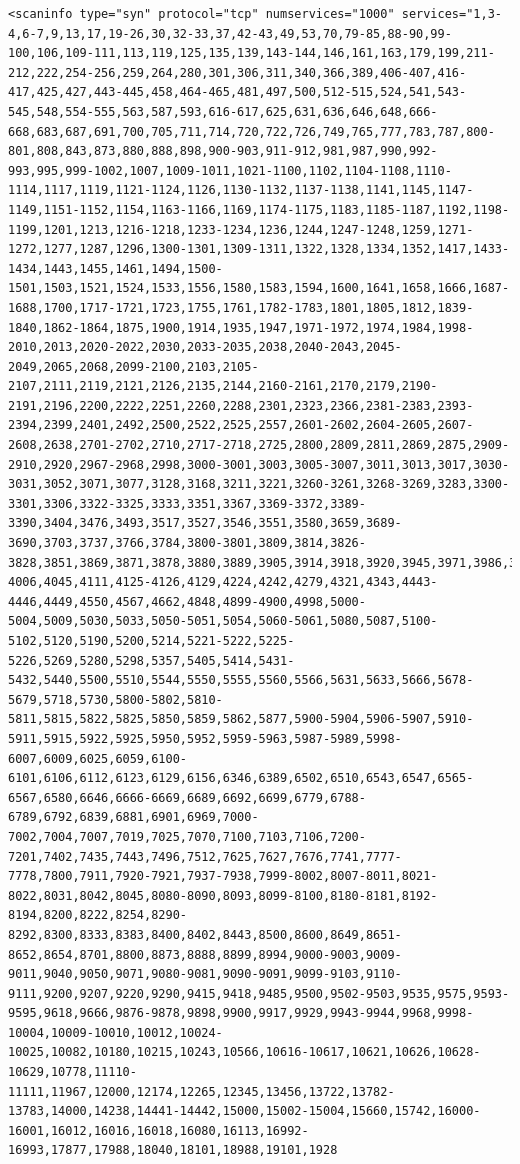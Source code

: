 \documentclass[10pt,a4paper]{report}
\begin{document}
\begin{verbatim}
<scaninfo type="syn" protocol="tcp" numservices="1000" services="1,3-4,6-7,9,13,17,19-26,30,32-33,37,42-43,49,53,70,79-85,88-90,99-100,106,109-111,113,119,125,135,139,143-144,146,161,163,179,199,211-212,222,254-256,259,264,280,301,306,311,340,366,389,406-407,416-417,425,427,443-445,458,464-465,481,497,500,512-515,524,541,543-545,548,554-555,563,587,593,616-617,625,631,636,646,648,666-668,683,687,691,700,705,711,714,720,722,726,749,765,777,783,787,800-801,808,843,873,880,888,898,900-903,911-912,981,987,990,992-993,995,999-1002,1007,1009-1011,1021-1100,1102,1104-1108,1110-1114,1117,1119,1121-1124,1126,1130-1132,1137-1138,1141,1145,1147-1149,1151-1152,1154,1163-1166,1169,1174-1175,1183,1185-1187,1192,1198-1199,1201,1213,1216-1218,1233-1234,1236,1244,1247-1248,1259,1271-1272,1277,1287,1296,1300-1301,1309-1311,1322,1328,1334,1352,1417,1433-1434,1443,1455,1461,1494,1500-1501,1503,1521,1524,1533,1556,1580,1583,1594,1600,1641,1658,1666,1687-1688,1700,1717-1721,1723,1755,1761,1782-1783,1801,1805,1812,1839-1840,1862-1864,1875,1900,1914,1935,1947,1971-1972,1974,1984,1998-2010,2013,2020-2022,2030,2033-2035,2038,2040-2043,2045-2049,2065,2068,2099-2100,2103,2105-2107,2111,2119,2121,2126,2135,2144,2160-2161,2170,2179,2190-2191,2196,2200,2222,2251,2260,2288,2301,2323,2366,2381-2383,2393-2394,2399,2401,2492,2500,2522,2525,2557,2601-2602,2604-2605,2607-2608,2638,2701-2702,2710,2717-2718,2725,2800,2809,2811,2869,2875,2909-2910,2920,2967-2968,2998,3000-3001,3003,3005-3007,3011,3013,3017,3030-3031,3052,3071,3077,3128,3168,3211,3221,3260-3261,3268-3269,3283,3300-3301,3306,3322-3325,3333,3351,3367,3369-3372,3389-3390,3404,3476,3493,3517,3527,3546,3551,3580,3659,3689-3690,3703,3737,3766,3784,3800-3801,3809,3814,3826-3828,3851,3869,3871,3878,3880,3889,3905,3914,3918,3920,3945,3971,3986,3995,3998,4000-4006,4045,4111,4125-4126,4129,4224,4242,4279,4321,4343,4443-4446,4449,4550,4567,4662,4848,4899-4900,4998,5000-5004,5009,5030,5033,5050-5051,5054,5060-5061,5080,5087,5100-5102,5120,5190,5200,5214,5221-5222,5225-5226,5269,5280,5298,5357,5405,5414,5431-5432,5440,5500,5510,5544,5550,5555,5560,5566,5631,5633,5666,5678-5679,5718,5730,5800-5802,5810-5811,5815,5822,5825,5850,5859,5862,5877,5900-5904,5906-5907,5910-5911,5915,5922,5925,5950,5952,5959-5963,5987-5989,5998-6007,6009,6025,6059,6100-6101,6106,6112,6123,6129,6156,6346,6389,6502,6510,6543,6547,6565-6567,6580,6646,6666-6669,6689,6692,6699,6779,6788-6789,6792,6839,6881,6901,6969,7000-7002,7004,7007,7019,7025,7070,7100,7103,7106,7200-7201,7402,7435,7443,7496,7512,7625,7627,7676,7741,7777-7778,7800,7911,7920-7921,7937-7938,7999-8002,8007-8011,8021-8022,8031,8042,8045,8080-8090,8093,8099-8100,8180-8181,8192-8194,8200,8222,8254,8290-8292,8300,8333,8383,8400,8402,8443,8500,8600,8649,8651-8652,8654,8701,8800,8873,8888,8899,8994,9000-9003,9009-9011,9040,9050,9071,9080-9081,9090-9091,9099-9103,9110-9111,9200,9207,9220,9290,9415,9418,9485,9500,9502-9503,9535,9575,9593-9595,9618,9666,9876-9878,9898,9900,9917,9929,9943-9944,9968,9998-10004,10009-10010,10012,10024-10025,10082,10180,10215,10243,10566,10616-10617,10621,10626,10628-10629,10778,11110-11111,11967,12000,12174,12265,12345,13456,13722,13782-13783,14000,14238,14441-14442,15000,15002-15004,15660,15742,16000-16001,16012,16016,16018,16080,16113,16992-16993,17877,17988,18040,18101,18988,19101,1928
\end{verbatim}
\end{document}
